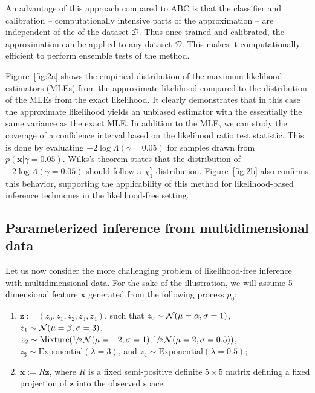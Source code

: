 \documentclass[12pt]{article}
\numberwithin{equation}{section}
\theoremstyle{plain}
\begin{document}
An advantage of this approach compared to ABC is that the
classifier and calibration -- computationally intensive
parts of the approximation  -- are independent of the of the dataset $\mathcal{D}$.
Thus once trained and calibrated, the approximation can be applied to any dataset $\mathcal{D}$.
This makes it computationally efficient to perform ensemble tests of the method.

Figure~\ref{fig:2a} shows the empirical distribution of the maximum likelihood estimators (MLEs) from the
approximate likelihood compared to the distribution of the MLEs from the exact likelihood.
It clearly demonstrates that in this case the approximate likelihood yields an unbiased estimator with the essentially the same variance as the exact MLE.
In addition to the MLE, we can study the coverage of a confidence interval based on the likelihood ratio test statistic.
This is done by evaluating $-2\log \Lambda(\gamma=0.05)$ for samples drawn from $p(\mathbf{x} | \gamma=0.05)$.
Wilks's theorem states that the distribution of $-2\log \Lambda(\gamma=0.05)$ should follow a $\chi^2_1$ distribution.
%
Figure~\ref{fig:2b} also confirms this behavior, supporting the applicability of this method for likelihood-based inference techniques in the likelihood-free setting.




\subsection{Parameterized inference from multidimensional data}

Let us now consider the more challenging problem of likelihood-free
inference with multidimensional data.
For the sake of the illustration, we will assume 5-dimensional feature $\mathbf{x}$ generated
from the following process $p_0$:
    \begin{enumerate}
        \item $\mathbf{z} := (z_0, z_1, z_2, z_3, z_4)$, such that
            $z_0 \sim {\cal N}(\mu=\alpha, \sigma=1)$,
            $z_1 \sim {\cal N}(\mu=\beta, \sigma=3)$,
            $z_2 \sim {\text{Mixture}}(\sfrac{1}{2}\,{\cal N}(\mu=-2, \sigma=1), \sfrac{1}{2}\,{\cal N}(\mu=2, \sigma=0.5))$,
            $z_3 \sim {\text{Exponential}(\lambda=3)}$, and
            $z_4 \sim {\text{Exponential}(\lambda=0.5)}$;
        \item $\mathbf{x} := R  \mathbf{z}$, where $R$ is a fixed
        semi-positive definite $5 \times 5$ matrix defining a fixed projection
        of $\mathbf{z}$ into the observed space.
    \end{enumerate}
\end{document}
